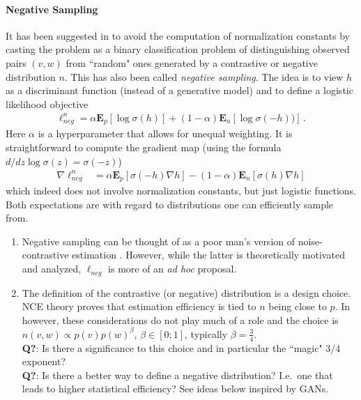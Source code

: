 \documentclass{article}
\newcommand{\E}{{\mathbf E}}
\begin{document}
\paragraph{Negative Sampling} 
It has been suggested in \cite{mikolov2013distributed} to avoid the computation of normalization constants by casting the problem as a binary classification problem of distinguishing observed pairs $(v,w)$ from ``random" ones generated by a contrastive or negative distribution $n$. This has also been called \textit{negative sampling}. The idea is to view $h$ as a discriminant function (instead of a generative model) and to define a logistic likelihood objective
\begin{align}
\ell^n_{neg}= 
\alpha \E_p[ \log \sigma(h)]  +(1-\alpha) \E_{n}[\log \sigma(-h))]\,.
\label{eq:negative}
\end{align}
Here $\alpha$ is a hyperparameter that allows for unequal weighting. 
It is straightforward to compute the gradient map (using the formula $d/dz \log \sigma(z) = \sigma(-z)$)
\begin{align}
\nabla \ell^n_{neg} & =  \alpha \E_p[\sigma(-h) \nabla h] - (1-\alpha) \E_{n}[\sigma(h) \nabla h]
\label{eq:neg-grad}
\end{align}
which indeed does not  involve normalization constants, but just logistic functions. Both expectations are with regard to distributions one can efficiently sample from.

\begin{enumerate}
\item Negative sampling can be thought of as a poor man's version of  noise-contrastive estimation \cite{gutmann2012noise}. However, while the latter is theoretically motivated and  analyzed, $\ell_{neg}$ is more of an \textit{ad hoc} proposal.
\item  The definition of the contrastive (or negative) distribution is a design choice. NCE theory proves that estimation efficiency is tied to $n$ being close to $p$. In \cite{mikolov2013distributed} however, these considerations do not play much of a role and the choice is $n(v,w) \propto p(v) p(w)^\beta$, $\beta \in [0;1]$, typically $\beta = \tfrac 34$. \\[2mm]
\textbf{Q?}: Is there a significance to this choice and in particular the ``magic" $3/4$ exponent? \\[2mm]
\textbf{Q?}: Is there a better way to define a negative distribution?  I.e.~one that leads to higher statistical efficiency? See ideas below inspired by GANs.
\end{enumerate}
\end{document}
